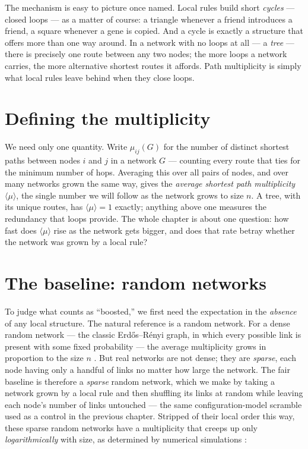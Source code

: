 The mechanism is easy to picture once named. Local rules build short
\emph{cycles} --- closed loops --- as a matter of course: a triangle whenever a
friend introduces a friend, a square whenever a gene is copied. And a cycle is
exactly a structure that offers more than one way around. In a network with no
loops at all --- a \emph{tree} --- there is precisely one route between any two
nodes; the more loops a network carries, the more alternative shortest routes it
affords. Path multiplicity is simply what local rules leave behind when they
close loops.

\section{Defining the multiplicity}

We need only one quantity. Write $\mu_{ij}(G)$ for the number of distinct
shortest paths between nodes $i$ and $j$ in a network $G$ --- counting every route
that ties for the minimum number of hops. Averaging this over all pairs of nodes,
and over many networks grown the same way, gives the \emph{average shortest path
multiplicity} $\langle\mu\rangle$, the single number we will follow as the
network grows to size $n$. A tree, with its unique routes, has $\langle\mu\rangle
= 1$ exactly; anything above one measures the redundancy that loops provide. The
whole chapter is about one question: how fast does $\langle\mu\rangle$ rise as the
network gets bigger, and does that rate betray whether the network was grown by a
local rule?

\section{The baseline: random networks}

To judge what counts as ``boosted,'' we first need the expectation in the 
\emph{absence} of any local structure. The natural reference is a random 
network. For a dense random network --- the classic Erd\H{o}s--R\'enyi graph, in 
which every possible link is present with some fixed probability --- the average 
multiplicity grows in proportion to the size $n$ \citep{dong2025}. But real 
networks are not dense; they are \emph{sparse}, each node having only a handful 
of links no matter how large the network. The fair baseline is therefore a 
\emph{sparse} random network, which we make by taking a network grown by a local 
rule and then shuffling its links at random while leaving each node's number of 
links untouched --- the same configuration-model scramble used as a control in 
the previous chapter. Stripped of their local order this way, these sparse 
random networks have a multiplicity that creeps up only \emph{logarithmically} 
with size, as determined by numerical simulations \citep{vazquezpaths2026}:

